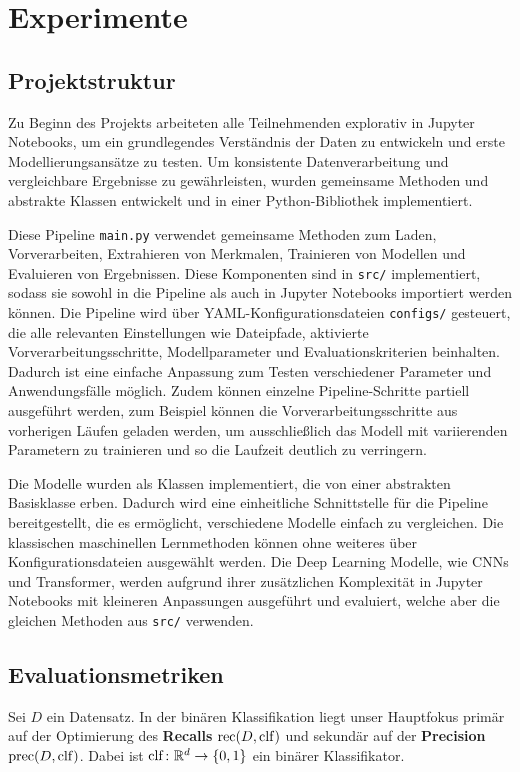 \section{Experimente}

\subsection{Projektstruktur}
\label{sec:projektstruktur}
Zu Beginn des Projekts arbeiteten alle Teilnehmenden explorativ in Jupyter Notebooks, um ein grundlegendes Verständnis der Daten zu entwickeln und erste Modellierungsansätze zu testen. Um konsistente Datenverarbeitung und vergleichbare Ergebnisse zu gewährleisten, wurden gemeinsame Methoden und abstrakte Klassen entwickelt und in einer Python-Bibliothek implementiert.

Diese Pipeline \texttt{main.py} verwendet gemeinsame Methoden zum Laden, Vorverarbeiten, Extrahieren von Merkmalen, Trainieren von Modellen und Evaluieren von Ergebnissen. Diese Komponenten sind in \texttt{src/} implementiert, sodass sie sowohl in die Pipeline als auch in Jupyter Notebooks importiert werden können. Die Pipeline wird über YAML-Konfigurationsdateien \texttt{configs/} gesteuert, die alle relevanten Einstellungen wie Dateipfade, aktivierte Vorverarbeitungsschritte, Modellparameter und Evaluationskriterien beinhalten. Dadurch ist eine einfache Anpassung zum Testen verschiedener Parameter und Anwendungsfälle möglich. Zudem können einzelne Pipeline-Schritte partiell ausgeführt werden, zum Beispiel können die Vorverarbeitungsschritte aus vorherigen Läufen geladen werden, um ausschließlich das Modell mit variierenden Parametern zu trainieren und so die Laufzeit deutlich zu verringern.

Die Modelle wurden als Klassen implementiert, die von einer abstrakten Basisklasse erben. Dadurch wird eine einheitliche Schnittstelle für die Pipeline bereitgestellt, die es ermöglicht, verschiedene Modelle einfach zu vergleichen. Die klassischen maschinellen Lernmethoden können ohne weiteres über Konfigurationsdateien ausgewählt werden. Die Deep Learning Modelle, wie CNNs und Transformer, werden aufgrund ihrer zusätzlichen Komplexität in Jupyter Notebooks mit kleineren Anpassungen ausgeführt und evaluiert, welche aber die gleichen Methoden aus \texttt{src/} verwenden.

\subsection{Evaluationsmetriken}
Sei $D$ ein Datensatz. In der binären Klassifikation liegt unser Hauptfokus primär auf der Optimierung des \textbf{Recalls} $\operatorname{rec}(D, \operatorname{clf})$ und sekundär auf der \textbf{Precision} $\operatorname{prec}(D, \operatorname{clf})$. Dabei ist $\operatorname{clf}\colon\mathbb{R}^d\to \{0, 1\}$ ein binärer Klassifikator.\\


